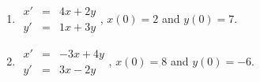\documentclass[10pt]{article}
\begin{document}
\begin{multicols}{2}
\begin{enumerate}
\setcounter{enumi}{\theenumCount}

\item $\begin{array}{ccc} x' & = & 4x + 2y \\ y' & = & 1x + 3y \end{array}$, $x(0) = 2$ and $y(0) = 7$. 

\item $\begin{array}{ccc} x' & = & -3x + 4y \\ y' & = & 3x - 2y \end{array}$, $x(0) = 8$ and $y(0) = -6$. 

\setcounter{enumCount}{\theenumi}
\end{enumerate} 
\end{multicols}
\vfill
\end{document}

